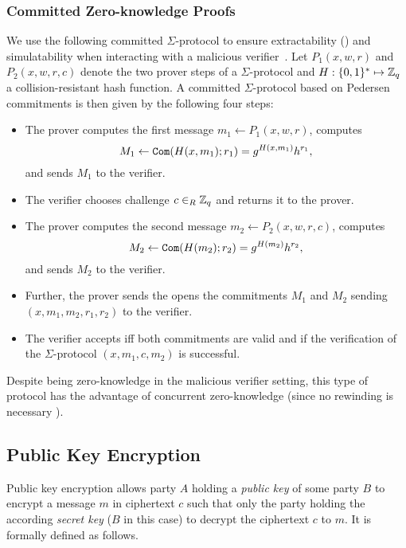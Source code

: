 \subsubsection{Committed Zero-knowledge Proofs}
We use the following committed $\Sigma$-protocol to ensure extractability (\ZKPoK) and simulatability when interacting with a malicious verifier~\cite{Damgard00,JareckiL00}.
Let $P_1(x,w,r)$ and $P_2(x,w,r,c)$ denote the two prover steps of a $\Sigma$-protocol and $H:\{0,1\}^\ast\mapsto\mathbb{Z}_q$ a collision-resistant hash function.
A committed $\Sigma$-protocol based on Pedersen commitments is then given by the following four steps:
\begin{itemize}
  \item The prover computes the first message $m_1\gets P_1(x,w,r)$, computes 
  \[M_1\gets\mathtt{Com}(H(x,m_1); r_1)=g^{H(x,m_1)}h^{r_1},\]
  and sends $M_1$ to the verifier.
  \item The verifier chooses challenge $c\in_R\mathbb{Z}_q$ and returns it to the prover.
  \item The prover computes the second message $m_2\gets P_2(x,w,r,c)$, computes 
  \[M_2\gets\mathtt{Com}(H(m_2); r_2)=g^{H(m_2)}h^{r_2},\]
   and sends $M_2$ to the verifier.
  \item Further, the prover sends the opens the commitments $M_1$ and $M_2$ sending $(x,m_1,m_2,r_1,r_2)$ to the verifier.
  \item The verifier accepts iff both commitments are valid and if the verification of the $\Sigma$-protocol $(x,m_1,c,m_2)$ is successful.
\end{itemize}

\noindent
Despite being zero-knowledge in the malicious verifier setting, this type of protocol has the advantage of concurrent zero-knowledge (since no rewinding is necessary \cite{Damgard00,JareckiL00}).


\subsection{Public Key Encryption}

Public key encryption allows party $A$ holding a \emph{public key \pk} of some party $B$ to encrypt a message $m$ in ciphertext $c$ such that only the party holding the according \emph{secret key \sk} ($B$ in this case) to decrypt the ciphertext $c$ to $m$.
It is formally defined as follows.

